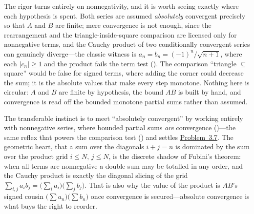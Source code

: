 \documentclass[main.tex]{subfiles}
\begin{document}
\begin{Reflection}
The rigor turns entirely on nonnegativity, and it is worth seeing exactly where each hypothesis is
spent. Both series are assumed \emph{absolutely} convergent precisely so that $A$ and $B$ are finite;
mere convergence is not enough, since the rearrangement and the triangle-inside-square comparison are
licensed only for nonnegative terms, and the Cauchy product of two conditionally convergent series can
genuinely diverge---the classic witness is $a_{n}=b_{n}=(-1)^{n}/\sqrt{n+1}$, where each $|c_{n}|\ge 1$
and the product fails the term test (). The comparison ``triangle $\subseteq$ square''
would be false for signed terms, where adding the corner could decrease the sum; it is the absolute
values that make every step monotone. Nothing here is circular: $A$ and $B$ are finite by hypothesis,
the bound $AB$ is built by hand, and convergence is read off the bounded monotone partial sums rather
than assumed.

The transferable instinct is to meet ``absolutely convergent'' by working entirely with nonnegative
series, where bounded partial sums \emph{are} convergence ()---the same reflex that powers
the comparison test () and settles \hyperlink{prob:3.7}{Problem~3.7}. The geometric heart,
that a sum over the diagonals $i+j=n$ is dominated by the sum over the product grid $i\le N$, $j\le N$,
is the discrete shadow of Fubini's theorem: when all terms are nonnegative a double sum may be totalled
in any order, and the Cauchy product is exactly the diagonal slicing of the grid
$\sum_{i,j}a_{i}b_{j}=\bigl(\sum_{i}a_{i}\bigr)\bigl(\sum_{j}b_{j}\bigr)$. That is also why the value of
the product is $AB$'s signed cousin $\bigl(\sum a_{n}\bigr)\bigl(\sum b_{n}\bigr)$ once convergence is
secured---absolute convergence is what buys the right to reorder.
\end{Reflection}
\end{document}
